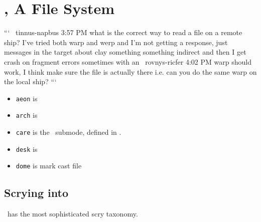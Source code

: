 \section[\clay]{\clay, A File System}

```
~tinnus-napbus
3:57 PM
what is the correct way to read a file on a remote ship? I've tried both warp and werp and I'm not getting a response, just messages in the target about clay something something indirect and then I get crash on fragment errors sometimes
with an %
~rovnys-ricfer
4:02 PM
warp should work, I think
make sure the file is actually there
i.e. can you do the same warp on the local ship?
```

\begin{itemize}
  \item  \texttt{aeon} is
  \item  \texttt{arch} is
  \item  \texttt{care} is the \clay~submode, defined in \lull.
  \item  \texttt{desk} is
  \item  \texttt{dome} is
  mark cast file
\end{itemize}


\subsection{Scrying into \clay}

\clay~has the most sophisticated scry taxonomy.

